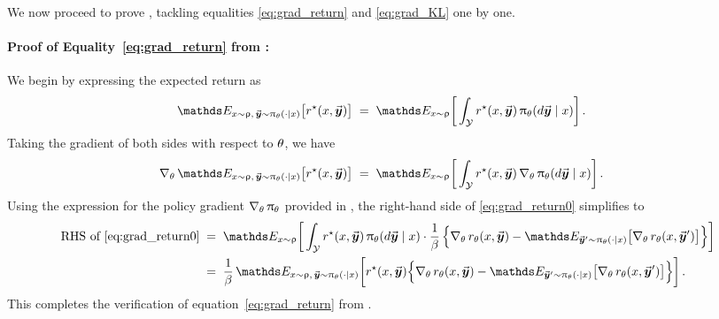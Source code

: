 		We now proceed to prove , tackling equalities \eqref{eq:grad_return} and \eqref{eq:grad_KL} one by one.
		
		\paragraph{Proof of Equality~\eqref{eq:grad_return} from :}
		We begin by expressing the expected return as
		\begin{align*}
			\Exp_{\prompt \sim \promptdistr, \, \response \sim \policytheta(\cdot \mid \prompt)} \big[ \rewardstar(\context, \response) \big]
			& \; = \; \Exp_{\prompt \sim \promptdistr} \bigg[ \int_{\ResponseSp} \rewardstar(\prompt, \response) \, \policytheta(\diff \response \mid \prompt) \bigg] \, .
		\end{align*}
		Taking the gradient of both sides with respect to $\theta$, we have
		\begin{align}
			\label{eq:grad_return0}
			\gradtheta \Exp_{\prompt \sim \promptdistr, \, \response \sim \policytheta(\cdot \mid \prompt)} \big[ \rewardstar(\context, \response) \big]
			& \; = \; \Exp_{\prompt \sim \promptdistr} \bigg[ \int_{\ResponseSp} \rewardstar(\prompt, \response) \, \gradtheta \policytheta(\diff \response \mid \prompt) \bigg] \, .
		\end{align}
		Using the expression for the policy gradient $\nabla_{\theta} \,  \uppi_{\theta}$ provided in , the right-hand side of \eqref{eq:grad_return0} simplifies to
		\begin{align*}
			\mbox{RHS of \eqref{eq:grad_return0}}
			& \; = \; \Exp_{\prompt \sim \promptdistr} \bigg[ \int_{\ResponseSp} \rewardstar(\prompt, \response) \, \policytheta(\diff \response \mid \prompt) \cdot \frac{1}{\parabeta} \,
			\Big\{ \gradtheta \rewardtheta(\prompt, \response) - \Exp_{\responsenew \sim \policytheta(\cdot \mid \prompt)}\big[ \gradtheta \rewardtheta(\prompt, \responsenew) \big] \Big\} \bigg]   \\
			& \; = \; \frac{1}{\parabeta} \,\Exp_{\prompt \sim \promptdistr, \, \response \sim \policytheta(\cdot \mid \prompt)} \bigg[ \rewardstar(\prompt, \response) 
			\Big\{ \gradtheta \rewardtheta(\prompt, \response) - \Exp_{\responsenew \sim \policytheta(\cdot \mid \prompt)}\big[ \gradtheta \rewardtheta(\prompt, \responsenew) \big] \Big\} \bigg] \, .
		\end{align*}
		This completes the verification of equation~\eqref{eq:grad_return} from .
		
